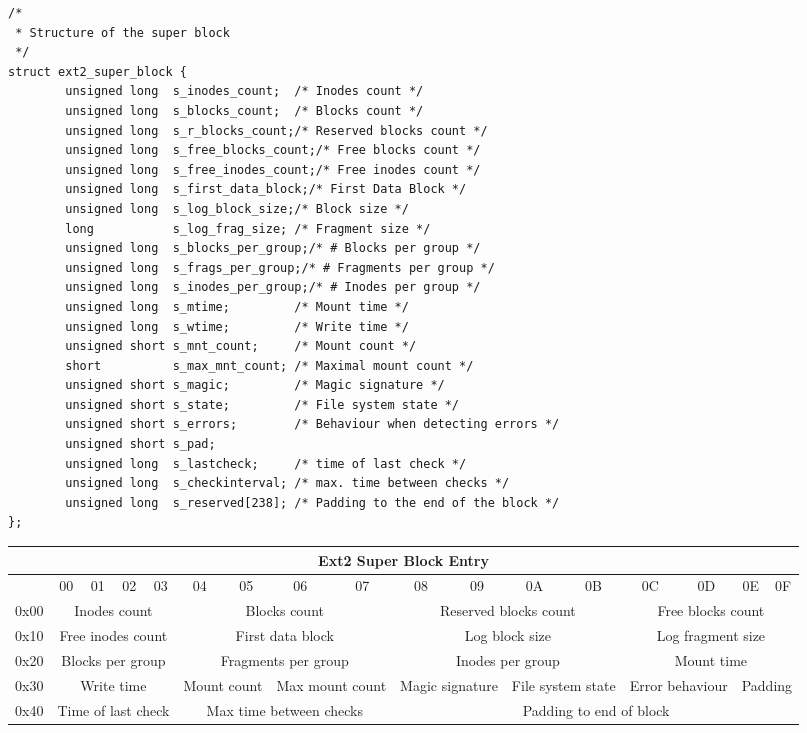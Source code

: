 \begin{verbatim}
/*
 * Structure of the super block
 */
struct ext2_super_block {
        unsigned long  s_inodes_count;  /* Inodes count */
        unsigned long  s_blocks_count;  /* Blocks count */
        unsigned long  s_r_blocks_count;/* Reserved blocks count */
        unsigned long  s_free_blocks_count;/* Free blocks count */
        unsigned long  s_free_inodes_count;/* Free inodes count */
        unsigned long  s_first_data_block;/* First Data Block */
        unsigned long  s_log_block_size;/* Block size */
        long           s_log_frag_size; /* Fragment size */
        unsigned long  s_blocks_per_group;/* # Blocks per group */
        unsigned long  s_frags_per_group;/* # Fragments per group */
        unsigned long  s_inodes_per_group;/* # Inodes per group */
        unsigned long  s_mtime;         /* Mount time */
        unsigned long  s_wtime;         /* Write time */
        unsigned short s_mnt_count;     /* Mount count */
        short          s_max_mnt_count; /* Maximal mount count */
        unsigned short s_magic;         /* Magic signature */
        unsigned short s_state;         /* File system state */
        unsigned short s_errors;        /* Behaviour when detecting errors */
        unsigned short s_pad;
        unsigned long  s_lastcheck;     /* time of last check */
        unsigned long  s_checkinterval; /* max. time between checks */
        unsigned long  s_reserved[238]; /* Padding to the end of the block */
};
\end{verbatim}

\scriptsize
\begin{tabular}{|r||c|c|c|c|c|c|c|c||c|c|c|c|c|c|c|c|}
\hline
\multicolumn{17}{|c|}{Ext2 Super Block Entry}
  \\ \hline\hline
 & 00 & 01 & 02 & 03 & 04 & 05 & 06 & 07 & 08 &
   09 & 0A & 0B & 0C & 0D & 0E & 0F \\ \hline
0x00 & \multicolumn{4}{c|}{Inodes count} & \multicolumn{4}{c||}{Blocks count} &
   \multicolumn{4}{c|}{Reserved blocks count} &
   \multicolumn{4}{c|}{Free blocks count} \\ \hline
0x10 & \multicolumn{4}{c|}{Free inodes count} &
   \multicolumn{4}{c||}{First data block} &
   \multicolumn{4}{c|}{Log block size} &
   \multicolumn{4}{c|}{Log fragment size} \\ \hline
0x20 & \multicolumn{4}{c|}{Blocks per group} & 
   \multicolumn{4}{c||}{Fragments per group} &
   \multicolumn{4}{c|}{Inodes per group} &
   \multicolumn{4}{c|}{Mount time} \\ \hline
0x30 & \multicolumn{4}{c|}{Write time} &
   \multicolumn{2}{c|}{Mount count} &
   \multicolumn{2}{c||}{Max mount count} &
   \multicolumn{2}{c|}{Magic signature} &
   \multicolumn{2}{c|}{File system state} &
   \multicolumn{2}{c|}{Error behaviour} &
   \multicolumn{2}{c|}{Padding} \\ \hline
0x40 & \multicolumn{4}{c|}{Time of last check} &
   \multicolumn{4}{c||}{Max time between checks} &
   \multicolumn{8}{c|}{Padding to end of block} \\ \hline
\end{tabular}
\normalsize

